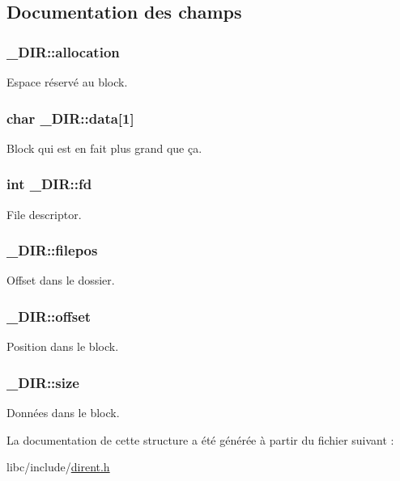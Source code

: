 \subsection{Documentation des champs}
\hypertarget{struct__DIR_a395fdd86b324fd71725a24e4f6edd55c}{
\subsubsection[{allocation}]{ \+\_\+\+D\+I\+R\+::allocation}}\label{struct__DIR_a395fdd86b324fd71725a24e4f6edd55c}
Espace réservé au block. \hypertarget{struct__DIR_a87bb023e0bf0b2f075e90d270ff7033e}{
\subsubsection[{data}]{\setlength{\rightskip}{0pt plus 5cm}char \+\_\+\+D\+I\+R\+::data\mbox{[}1\mbox{]}}}\label{struct__DIR_a87bb023e0bf0b2f075e90d270ff7033e}
Block qui est en fait plus grand que ça. \hypertarget{struct__DIR_a1ee17b3cb06ddc80fb648e65c8353c55}{
\subsubsection[{fd}]{\setlength{\rightskip}{0pt plus 5cm}int \+\_\+\+D\+I\+R\+::fd}}\label{struct__DIR_a1ee17b3cb06ddc80fb648e65c8353c55}
File descriptor. \hypertarget{struct__DIR_a759e6f1c2754b12a4aba9d120f3d1e57}{
\subsubsection[{filepos}]{ \+\_\+\+D\+I\+R\+::filepos}}\label{struct__DIR_a759e6f1c2754b12a4aba9d120f3d1e57}
Offset dans le dossier. \hypertarget{struct__DIR_a298b074b577743d5c726b4fdc2917795}{
\subsubsection[{offset}]{ \+\_\+\+D\+I\+R\+::offset}}\label{struct__DIR_a298b074b577743d5c726b4fdc2917795}
Position dans le block. \hypertarget{struct__DIR_a117676c5eb31163a8b99520bd2cbf1aa}{
\subsubsection[{size}]{ \+\_\+\+D\+I\+R\+::size}}\label{struct__DIR_a117676c5eb31163a8b99520bd2cbf1aa}
Données dans le block. 

La documentation de cette structure a été générée à partir du fichier suivant \+:\begin{DoxyCompactItemize}
\item 
libc/include/\hyperlink{dirent_8h}{dirent.\+h}\end{DoxyCompactItemize}
